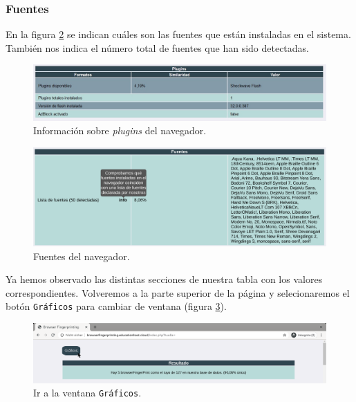 \subsubsection{Fuentes}
En la figura \ref{fig:fuentesSection} se indican cuáles son las fuentes que están instaladas en el sistema. También nos indica el número total de fuentes que han sido detectadas.

\begin{figure}[tbp]
	\centering
	\includegraphics[width=1\textwidth]{Images/pluginsSection.jpg}
	\caption{Información sobre \textit{plugins} del navegador.}
	\label{fig:pluginsSection}
\end{figure}

\begin{figure}[tbp]
	\centering
	\includegraphics[width=1\textwidth]{Images/fuentesSection.png}
	\caption{Fuentes del navegador.}
	\label{fig:fuentesSection}
\end{figure}

Ya hemos observado las distintas secciones de nuestra tabla con los valores correspondientes. Volveremos a la parte superior de la página y selecionaremos el botón \texttt{Gráficos} para cambiar de ventana (figura \ref{fig:graficosBoton}).

\begin{figure}[tbp]
	\centering
	\includegraphics[width=1\textwidth]{Images/graficosBoton.png}
	\caption{Ir a la ventana \texttt{Gráficos}.}
	\label{fig:graficosBoton}
\end{figure}


